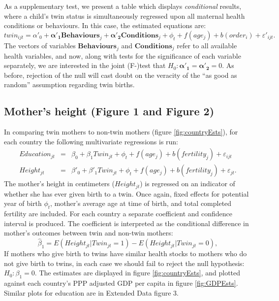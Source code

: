 \documentclass{nature}
\begin{document}
\begin{linenumbers}
As a supplementary test, we present a table which displays \emph{conditional} results, where a child's twin status is simultaneously regressed upon all maternal health conditions or behaviours.  In this case, the estimated equations are:
\begin{equation}
  \label{reg:twincond}
  twin_{ijt}=\alpha'_0 + \bm{\alpha'_1} \bm{Behaviours}_j + \bm{\alpha'_2} \bm{Conditions}_j + \phi_t + f(age_j) + b(order_i) + \varepsilon'_{ijt}.
\end{equation}
The vectors of variables $\bm{Behaviours}_j$ and $\bm{Conditions}_j$ refer to all available health variables, and now, along with tests for the significance of each variable separately, we are interested in the joint (F-)test that $H_0:\bm{\alpha'_1}=\bm{\alpha'_2}=0$.  As before, rejection of the null will cast doubt on the veracity of the ``as good as random'' assumption regarding twin births.


\subsection{Mother's height (Figure 1 and Figure 2)}
In comparing twin mothers to non-twin mothers (figure \ref{fig:countryEsts}), for each country the following multivariate regressions is run:
\begin{eqnarray}
  Education_{jt}&=&\beta_0 + \beta_1 Twin_{jt} + \phi_t + f(age_j) + b(fertility_j) + \varepsilon_{ijt} \\
  Height_{jt}&=&\beta'_0 + \beta'_1 Twin_{jt} + \phi_t + f(age_j) + b(fertility_j) + \varepsilon_{jt}.
\end{eqnarray}
The mother's height in centimeters ($Height_{jt}$) is regressed on an indicator of whether she has ever given birth to a twin.  Once again, fixed effects for potential year of birth $\phi_t$, mother's average age at time of birth, and total completed fertility are included.  For each country a separate coefficient and confidence interval is produced.  The coefficient is interpreted as the conditional difference in mother's outcomes between twin and non-twin mothers:
\[
\hat\beta_1 = E(Height_{jt}| Twin_{jt}=1) - E(Height_{jt}| Twin_{jt}=0),
\]
 If mothers who give birth to twins have similar health stocks to mothers who do not give birth to twins, in each case we should fail to reject the null hypothesis: $H_0: \beta_1=0$.  The estimates are displayed in figure \ref{fig:countryEsts}, and plotted against each country's PPP adjusted GDP per capita in figure \ref{fig:GDPEsts}.  Similar plots for education are in Extended Data figure 3.%


\end{linenumbers}
\end{document}
